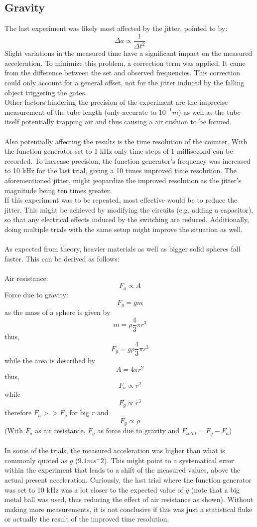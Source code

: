 \documentclass[fleqn,14pt]{article}
\begin{document}
\subsection{Gravity}
The last experiment was likely most affected by the jitter, pointed to by:
$$
\Delta a \propto \frac{1}{\Delta t^2}
$$
Slight variations in the measured time have a significant impact on the measured acceleration. To minimize
this problem, a correction term was applied. It came from the difference between the set and observed frequencies.
This correction could only account for a general offset,
not for the jitter induced by the falling object triggering the gates.\\
Other factors hindering the precision of the experiment are the imprecise measurement of the tube length (only
accurate to $10^{-1}m$) as well as the tube itself potentially trapping air and thus causing a air cushion to
be formed. \\
\\
Also potentially affecting the results is the time resolution of the counter. With the function generator
set to 1 kHz only time-steps of 1 millisecond can be recorded. To increase precision, the function generator's
frequency was increased to 10 kHz for the last trial, giving a 10 times improved time resolution.
The aforementioned jitter, might jeopardize the improved resolution as the jitter's magnitude being ten times
greater. 
\\
If this experiment was to be repeated, most effective would be to reduce the jitter. This might be achieved by 
modifying the circuits (e.g. adding a capacitor), so that any electrical effects induced by the switching
are reduced. Additionally, doing multiple trials with the same setup might improve the situation as well.\\
\\
As expected from theory, heavier materials as well as bigger solid spheres fall faster.
This can be derived as follows:\\
\\
Air resistance:
$$
F_a \propto A
$$
Force due to gravity:
$$
F_g = g m
$$
as the mass of a sphere is given by
$$
m = \rho \frac{4}{3} \pi r^3
$$
thus,
$$
F_g = g \rho \frac{4}{3} \pi r^3
$$
while the area is described by
$$
A =  4 \pi r^2
$$
thus,
$$
F_a \propto r^2
$$
while
$$
F_g \propto r^3
$$
therefore $F_a >> F_g$ for big $r$
and
$$
F_g \propto \rho
$$
(With $F_a$ as air resistance, $F_g$ as force due to gravity and
$F_{total} = F_g - F_a$)\\
\\
In some
of the trials, the measured acceleration was higher than what is commonly quoted as $g$ ($9.1ms^-2$).
This might point to a systematical error within the experiment that leads to a shift of the measured values, above
the actual present acceleration. Curiously, the last trial where the function generator was set to 10 kHz was
a lot closer to the expected value of $g$ (note that a big metal ball was used, thus reducing the effect of 
air resistance as shown). Without making more measurements, it is not conclusive if this was just a statistical
fluke or actually the result of the improved time resolution.
\end{document}
